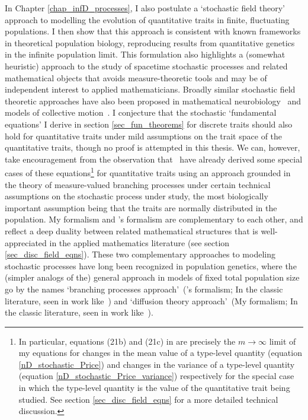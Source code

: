 In Chapter \ref{chap_infD_processes}, I also postulate a `stochastic field theory' approach to modelling the evolution of quantitative traits in finite, fluctuating populations. I then show that this approach is consistent with known frameworks in theoretical population biology, reproducing results from quantitative genetics in the infinite population limit. This formulation also highlights a (somewhat heuristic) approach to the study of spacetime stochastic processes and related mathematical objects that avoids measure-theoretic tools and may be of independent interest to applied mathematicians. Broadly similar stochastic field theoretic approaches have also been proposed in mathematical neurobiology~\citep{buice_field-theoretic_2007,bressloff_stochastic_2010,coombes_neural_2014} and models of collective motion~\citep{o_laighleis_minimal_2018}. I  conjecture that the stochastic `fundamental equations' I derive in section \ref{sec_fun_theorems} for discrete traits should also hold for quantitative traits under mild assumptions on the trait space of the quantitative traits, though no proof is attempted in this thesis. We can, however, take encouragement from the observation that~\cite{week_white_2021} have already derived some special cases of these equations\footnote{In particular, equations (21b) and (21c) in \cite{week_white_2021} are precisely the $m \to \infty$ limit of my equations for changes in the mean value of a type-level quantity (equation \ref{nD_stochastic_Price}) and changes in the variance of a type-level quantity (equation \ref{nD_stochastic_Price_variance}) respectively for the special case in which the type-level quantity is the value of the quantitative trait being studied. See section \ref{sec_disc_field_eqns} for a more detailed technical discussion.} for quantitative traits using an approach grounded in the theory of measure-valued branching processes under certain technical assumptions on the stochastic process under study, the most biologically important assumption being that the traits are normally distributed in the population. My formalism and \cite{week_white_2021}'s formalism are complementary to each other, and reflect a deep duality between related mathematical structures that is well-appreciated in the applied mathematics literature (see section \ref{sec_disc_field_eqns}). These two complementary approaches to modeling stochastic processes have long been recognized in population genetics, where the (simpler analogs of the) general approach in models of fixed total population size go by the names `branching processes approach'~(\cite{week_white_2021}'s formalism; In the classic literature, seen in work like~\cite{haldane_mathematical_1927,fisher_distribution_1931}) and `diffusion theory approach'~(My formalism; In the classic literature, seen in work like~\cite{fisher_dominance_1923,wright_evolution_1931,kimura_problems_1957}).
  
